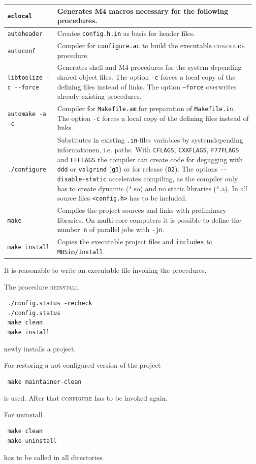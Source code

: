 	\begin{tabular}{|l|p{100mm}|}
	\hline
		\texttt{aclocal} & Generates M4 macros necessary for the following procedures.\\\hline
		\texttt{autoheader} & Creates \texttt{config.h.in} as basis for header files.\\\hline
		\texttt{autoconf} & Compiler for \texttt{configure.ac} to build the executable \textsc{configure} procedure.\\\hline
		\verb|libtoolize -c --force| & Generates shell and M4 procedures for the system depending shared object files. The option \texttt{-c} forces a local copy of the defining files instead of links. The option \texttt{--force} overwrites already existing procedures.\\\hline
		\texttt{automake -a -c} & Compiler for \texttt{Makefile.am} for preparation of \texttt{Makefile.in}. The option \texttt{-c} forces a local copy of the defining files instead of links.\\\hline
		\verb|./configure| & Substitutes in existing \texttt{.in}-files variables by systemdepending informationen, i.e. paths. With \texttt{CFLAGS}, \texttt{CXXFLAGS}, \texttt{F77FLAGS} and \texttt{FFFLAGS} the compiler can create code for degugging with \texttt{ddd} or \texttt{valgrind} (\texttt{g3}) or for release (\texttt{O2}). The options \verb|--disable-static| accelerates compiling, as the compiler only has to create dynamic (*.so) and no static libraries (*.a). In all source files \texttt{<config.h>} has to be included. \\\hline
		\texttt{make} & Compiles the project sources and links with preliminary libraries. On multi-core computers it is possible to define the number~\texttt{n} of parallel jobs with \texttt{-jn}.\\\hline
		\texttt{make install} & Copies the executable project files and \texttt{includes} to \texttt{MBSim/Install}.\\\hline 
	\end{tabular}
\par It is reasonable to write an executable file invoking the procedures. 
\par The procedure \textsc{reinstall}
\begin{verbatim}
 ./config.status -recheck
 ./config.status
 make clean
 make install
\end{verbatim}
newly installs a project.\par
For restoring a not-configured version of the project
\begin{verbatim}
 make maintainer-clean
\end{verbatim}
is used. After that \textsc{configure} has to be invoked again.\par 
For uninstall
\begin{verbatim}
 make clean
 make uninstall
\end{verbatim}
has to be called in all directories.

